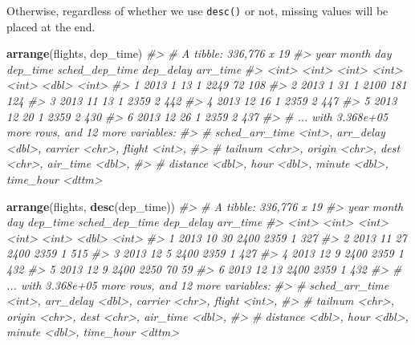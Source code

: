 \documentclass[]{book}
\newenvironment{Shaded}{\begin{snugshade}}{\end{snugshade}}
\newcommand{\CommentTok}[1]{\textcolor[rgb]{0.56,0.35,0.01}{\textit{#1}}}
\newcommand{\KeywordTok}[1]{\textcolor[rgb]{0.13,0.29,0.53}{\textbf{#1}}}
\newcommand{\NormalTok}[1]{#1}
\theoremstyle{plain}
\theoremstyle{remark}
\begin{document}
Otherwise, regardless of whether we use \texttt{desc()} or not, missing values will
be placed at the end.

\begin{Shaded}
\begin{Highlighting}[]
\KeywordTok{arrange}\NormalTok{(flights, dep_time)}
\CommentTok{#> # A tibble: 336,776 x 19}
\CommentTok{#>    year month   day dep_time sched_dep_time dep_delay arr_time}
\CommentTok{#>   <int> <int> <int>    <int>          <int>     <dbl>    <int>}
\CommentTok{#> 1  2013     1    13        1           2249        72      108}
\CommentTok{#> 2  2013     1    31        1           2100       181      124}
\CommentTok{#> 3  2013    11    13        1           2359         2      442}
\CommentTok{#> 4  2013    12    16        1           2359         2      447}
\CommentTok{#> 5  2013    12    20        1           2359         2      430}
\CommentTok{#> 6  2013    12    26        1           2359         2      437}
\CommentTok{#> # ... with 3.368e+05 more rows, and 12 more variables:}
\CommentTok{#> #   sched_arr_time <int>, arr_delay <dbl>, carrier <chr>, flight <int>,}
\CommentTok{#> #   tailnum <chr>, origin <chr>, dest <chr>, air_time <dbl>,}
\CommentTok{#> #   distance <dbl>, hour <dbl>, minute <dbl>, time_hour <dttm>}
\end{Highlighting}
\end{Shaded}

\begin{Shaded}
\begin{Highlighting}[]
\KeywordTok{arrange}\NormalTok{(flights, }\KeywordTok{desc}\NormalTok{(dep_time))}
\CommentTok{#> # A tibble: 336,776 x 19}
\CommentTok{#>    year month   day dep_time sched_dep_time dep_delay arr_time}
\CommentTok{#>   <int> <int> <int>    <int>          <int>     <dbl>    <int>}
\CommentTok{#> 1  2013    10    30     2400           2359         1      327}
\CommentTok{#> 2  2013    11    27     2400           2359         1      515}
\CommentTok{#> 3  2013    12     5     2400           2359         1      427}
\CommentTok{#> 4  2013    12     9     2400           2359         1      432}
\CommentTok{#> 5  2013    12     9     2400           2250        70       59}
\CommentTok{#> 6  2013    12    13     2400           2359         1      432}
\CommentTok{#> # ... with 3.368e+05 more rows, and 12 more variables:}
\CommentTok{#> #   sched_arr_time <int>, arr_delay <dbl>, carrier <chr>, flight <int>,}
\CommentTok{#> #   tailnum <chr>, origin <chr>, dest <chr>, air_time <dbl>,}
\CommentTok{#> #   distance <dbl>, hour <dbl>, minute <dbl>, time_hour <dttm>}
\end{Highlighting}
\end{Shaded}
\end{document}
